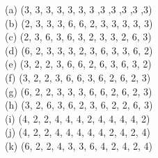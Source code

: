\documentclass[suppldata, dvipdfmx]{interact}
\theoremstyle{plain}%
\theoremstyle{definition}
\theoremstyle{remark}
\theoremstyle{problemstyle}
\begin{document}
\noindent
(a) (3, 3, 3, 3, 3, 3, 3 ,3 ,3 ,3 ,3 ,3)\\
(b) (2, 3, 3, 3, 6, 6, 2, 3, 3, 3, 3, 3)\\
(c) (2, 3, 6, 3, 6, 3, 2, 3, 3, 2, 6, 3)\\
(d) (6, 2, 3, 3, 3, 2, 3, 6, 3, 3, 6, 2)\\
(e) (3, 2, 2, 3, 6, 6, 2, 6, 3, 6, 3, 2)\\
(f) (3, 2, 2, 3, 6, 6, 3, 6, 2, 6, 2, 3)\\
(g) (6, 2, 2, 3, 3, 3, 6, 6, 2, 6, 2, 3)\\
(h) (3, 2, 6, 3, 6, 2, 3, 6, 2, 2, 6, 3)\\
(i) (4, 2, 2, 4, 4, 4, 2, 4, 4, 4, 4, 2)\\
(j) (4, 2, 2, 4, 4, 4, 4, 4, 2, 4, 2, 4)\\
(k) (6, 2, 2, 4, 3, 3, 6, 4, 2, 4, 2, 4)\\
\end{document}
